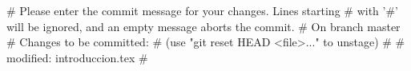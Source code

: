 
# Please enter the commit message for your changes. Lines starting
# with '#' will be ignored, and an empty message aborts the commit.
# On branch master
# Changes to be committed:
#   (use "git reset HEAD <file>..." to unstage)
#
#	modified:   introduccion.tex
#
